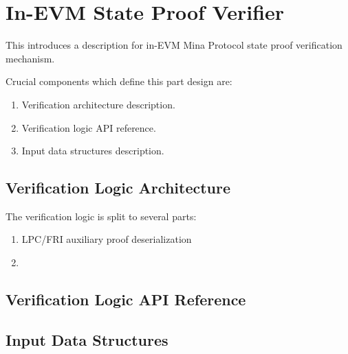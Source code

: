 \chapter{In-EVM State Proof Verifier}

This introduces a description for in-EVM Mina Protocol state proof verification
mechanism.

Crucial components which define this part design are:
\begin{enumerate}
    \item Verification architecture description.
    \item Verification logic API reference.
    \item Input data structures description.
\end{enumerate}

\section{Verification Logic Architecture}

The verification logic is split to several parts:
\begin{enumerate}
    \item LPC/FRI auxiliary proof deserialization
    \item
\end{enumerate}

\section{Verification Logic API Reference}

\section{Input Data Structures}

